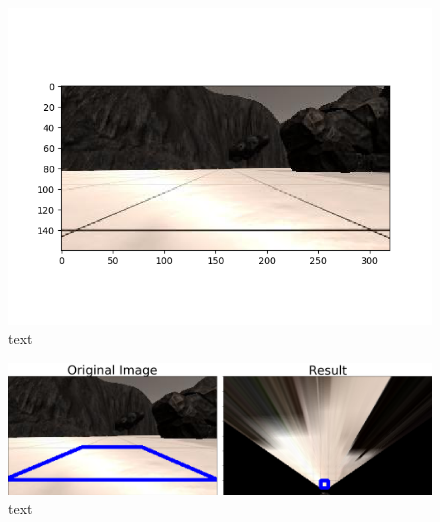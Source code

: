 \documentclass[a4paper]{article}
\begin{document}
\begin{figure}
	\centering
	\includegraphics[scale=0.5]{image3}
	\caption{text}
\end{figure}

\begin{figure}
	\centering
	\includegraphics[scale=0.5]{image4}
	\caption{text}
\end{figure}
\end{document}
